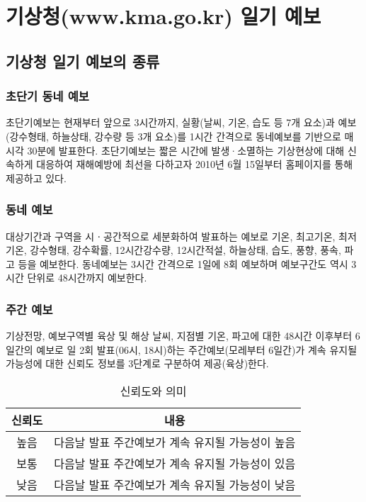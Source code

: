 

\chapter{기상청(www.kma.go.kr) 일기 예보}

\section{기상청 일기 예보의 종류}


\subsection{초단기 동네 예보}
초단기예보는 현재부터 앞으로 3시간까지, 실황(날씨, 기온, 습도 등 7개 요소)과 예보(강수형태, 하늘상태, 강수량 등 3개 요소)를 1시간 간격으로 동네예보를 기반으로 매 시각 30분에 발표한다. 초단기예보는 짧은 시간에 발생·소멸하는 기상현상에 대해 신속하게 대응하여 재해예방에 최선을 다하고자 2010년 6월 15일부터 홈페이지를 통해 제공하고 있다.

\subsection{동네 예보}
대상기간과 구역을 시ㆍ공간적으로 세분화하여 발표하는 예보로 기온, 최고기온, 최저기온, 강수형태, 강수확률, 12시간강수량, 12시간적설, 하늘상태, 습도, 풍향, 풍속, 파고 등을 예보한다. 동네예보는 3시간 간격으로 1일에 8회 예보하며 예보구간도 역시 3시간 단위로 48시간까지 예보한다. 

\subsection{주간 예보}
기상전망, 예보구역별 육상 및 해상 날씨, 지점별 기온, 파고에 대한 48시간 이후부터  6일간의 예보로 일 2회 발표(06시, 18시)하는 주간예보(모레부터 6일간)가 계속 유지될 가능성에 대한 신뢰도 정보를 3단계로 구분하여 제공(육상)한다.

\begin{table}[h]
	\centering
	\caption{신뢰도와 의미}
	\begin{tabular*}{.8\linewidth}{c|c}
		\hline 
		신뢰도  &	내용	  \\ 	\hline 
		높음  & 다음날 발표 주간예보가 계속 유지될 가능성이 높음  \\  \hline 
		보통 & 다음날 발표 주간예보가 계속 유지될 가능성이 있음  \\ 	\hline 
		낮음 & 다음날 발표 주간예보가 계속 유지될 가능성이 낮음   \\ 	\hline 
	\end{tabular*} 
\end{table}

